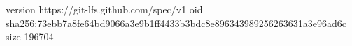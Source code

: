 version https://git-lfs.github.com/spec/v1
oid sha256:73ebb7a8fe64bd9066a3e9b1ff4433b3bdc8e896343989256263631a3e96ad6c
size 196704
